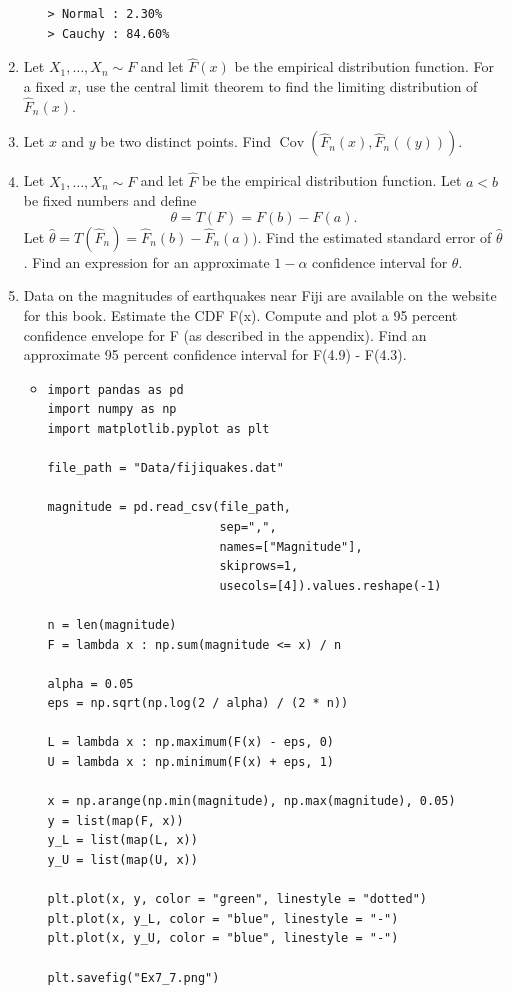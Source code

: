 \documentclass{article}
\begin{document}
\begin{enumerate}
\begin{itemize}
\begin{verbatim}
> Normal : 2.30%
> Cauchy : 84.60%
			\end{verbatim}
		\end{itemize}
	\item Let $X_1, \dots, X_n \sim F$ and let $\hat{F}(x)$ be the empirical distribution function. For a fixed $x$, use the central limit theorem to find the limiting distribution of $\hat{F}_n(x)$.
	\item Let $x$ and $y$ be two distinct points. Find $\operatorname{Cov}(\hat{F}_n(x), \hat{F}_n((y)))$.
	\item Let $X_1, \dots, X_n \sim F$ and let $\hat{F}$ be the empirical distribution function. Let $a < b$ be fixed numbers and define
	$$
	\theta = T(F) = F(b) - F(a).
	$$
	Let $\hat{\theta} = T(\hat{F}_n) = \hat{F}_n(b) - \hat{F}_n(a))$. Find the estimated standard error of $\hat{\theta}$. Find an expression for an approximate $1 - \alpha$ confidence interval for $\theta$.
	\item Data on the magnitudes of earthquakes near Fiji are available on the website for this book. Estimate the CDF F(x). Compute and plot a 95 percent confidence envelope for F (as described in the appendix). Find an approximate 95 percent confidence interval for F(4.9) - F(4.3).
		\begin{itemize}
			\item 
\begin{verbatim}
import pandas as pd
import numpy as np
import matplotlib.pyplot as plt

file_path = "Data/fijiquakes.dat"

magnitude = pd.read_csv(file_path,
                        sep=",",
                        names=["Magnitude"],
                        skiprows=1,
                        usecols=[4]).values.reshape(-1)

n = len(magnitude)
F = lambda x : np.sum(magnitude <= x) / n

alpha = 0.05
eps = np.sqrt(np.log(2 / alpha) / (2 * n))

L = lambda x : np.maximum(F(x) - eps, 0)
U = lambda x : np.minimum(F(x) + eps, 1)

x = np.arange(np.min(magnitude), np.max(magnitude), 0.05)
y = list(map(F, x))
y_L = list(map(L, x))
y_U = list(map(U, x))

plt.plot(x, y, color = "green", linestyle = "dotted")
plt.plot(x, y_L, color = "blue", linestyle = "-")
plt.plot(x, y_U, color = "blue", linestyle = "-")

plt.savefig("Ex7_7.png")


\end{verbatim}
\end{itemize}
\end{enumerate}
\end{document}
